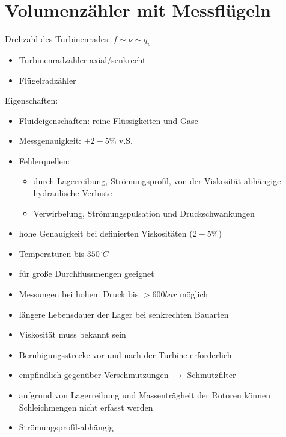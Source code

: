 \section{Volumenzähler mit Messflügeln}
Drehzahl des Turbinenrades: $f \sim \nu \sim q_v$
\begin{itemize}
\item Turbinenradzähler axial/senkrecht
\item Flügelradzähler
\end{itemize}
Eigenschaften:
\begin{itemize}
\item Fluideigenschaften: reine Flüssigkeiten und Gase
\item Messgenauigkeit: $\pm 2-5\%$ v.S.
\item Fehlerquellen:
\begin{itemize}
\item durch Lagerreibung, Strömungsprofil, von der Viskosität abhängige hydraulische Verluste
\item Verwirbelung, Strömungspulsation und Druckschwankungen
\end{itemize}
\end{itemize}
\begin{itemize}[label=$+$]
\item hohe Genauigkeit bei definierten Viskositäten ($2-5\%$)
\item Temperaturen bis $350\unit{^\circ C}$
\item für große Durchflussmengen geeignet
\item Messungen bei hohem Druck bis $>600 \unit{bar}$ möglich
\item längere Lebensdauer der Lager bei senkrechten Bauarten
\end{itemize}
\begin{itemize}[label=$-$]
\item Viskosität muss bekannt sein
\item Beruhigungsstrecke vor und nach der Turbine erforderlich
\item empfindlich gegenüber Verschmutzungen $\to$ Schmutzfilter
\item aufgrund von Lagerreibung und Massenträgheit der Rotoren können Schleichmengen nicht erfasst werden
\item Strömungsprofil-abhängig
\end{itemize}
